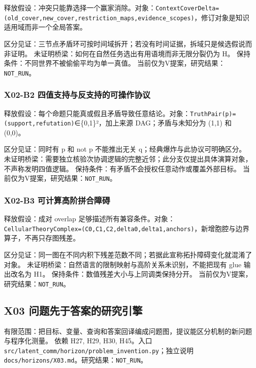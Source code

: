 \documentclass[
  10pt,
]{article}
\begin{document}
释放假设：冲突只能靠选择一个赢家消除。对象：\nolinkurl{ContextCoverDelta=(old_cover,new_cover,restriction_maps,evidence_scopes)}，修订对象是知识适用域而非一个全局答案。

区分见证：三节点矛盾环可按时间域拆开；若没有时间证据，拆域只是候选假说而非证明。
未证明桥梁：如何在自然任务选出有用语境而非无限分裂仍为 H。
保持条件：不同世界不被偷偷平均为单一真值。
当前仅为V提案，研究结果：\nolinkurl{NOT_RUN}。

\subsubsection{X02-B2
四值支持与反支持的可操作协议}\label{x02-b2-ux56dbux503cux652fux6301ux4e0eux53cdux652fux6301ux7684ux53efux64cdux4f5cux534fux8bae}

释放假设：每个命题只能真或假且矛盾导致任意结论。对象：\nolinkurl{TruthPair(p)=(support,refutation)}∈\{0,1\}²，加上来源
DAG；矛盾与未知分为 (1,1) 和 (0,0)。

区分见证：同时有 p 和 not p 不能推出无关 q；经典爆炸与此协议可明确区分。
未证明桥梁：需要独立核验次协调逻辑的完整近邻；此分支仅提出具体演算对象，不声称发明四值逻辑。
保持条件：有矛盾不会授权任意动作或覆盖外部目标。
当前仅为V提案，研究结果：\nolinkurl{NOT_RUN}。

\subsubsection{X02-B3
可计算高阶拼合障碍}\label{x02-b3-ux53efux8ba1ux7b97ux9ad8ux9636ux62fcux5408ux969cux788d}

释放假设：成对 overlap
足够描述所有兼容条件。对象：\nolinkurl{CellularTheoryComplex=(C0,C1,C2,delta0,delta1,anchors)}，新增胞腔与边界算子，不再只存图残差。

区分见证：同一图在不同内积下残差范数不同；若据此宣称拓扑障碍变化就混淆了对象。
未证明桥梁：自然语言的限制映射与高阶关系未识别，不能把现有 glue
输出改名为 H1。 保持条件：数值残差大小与上同调类保持分开。
当前仅为V提案，研究结果：\nolinkurl{NOT_RUN}。

\subsection{X03
问题先于答案的研究引擎}\label{x03-ux95eeux9898ux5148ux4e8eux7b54ux6848ux7684ux7814ux7a76ux5f15ux64ce}

有限范围：把目标、变量、查询和答案回译编成问题图，提议能区分机制的新问题与程序化测量。
依赖 H27, H29, H30, H45。入口
{\small\nolinkurl{src/latent_comm/horizon/problem_invention.py}}；独立说明
{\small\nolinkurl{docs/horizons/X03.md}}。研究结果：\nolinkurl{NOT_RUN}。
\end{document}
